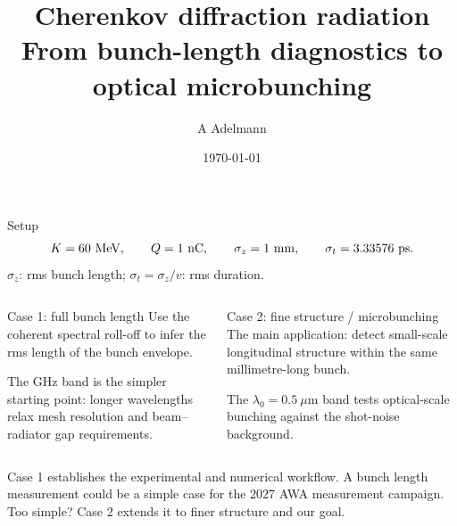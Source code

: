 \documentclass[10pt,aspectratio=169]{beamer}
\title{Cherenkov diffraction radiation\\[0.2em]\large From bunch-length diagnostics to optical microbunching}
\author{A Adelmann}
\date{\today}
\begin{document}
\begin{frame}
  \titlepage
  \vfill
\end{frame}

\begin{frame}{Setup}
\[
 K=60\ \mathrm{MeV},\qquad Q=1\ \mathrm{nC},\qquad
 \sigma_z=1\ \mathrm{mm},\qquad \sigma_t=\SigmaTimePs\ \mathrm{ps}.
\]
\(\sigma_z\): rms bunch length; \(\sigma_t=\sigma_z/v\): rms duration.
\normalsize
\begin{columns}[T,onlytextwidth]
\begin{block}{Case 1: full bunch length}
Use the coherent spectral roll-off to infer the rms length of the bunch envelope.

\medskip
The GHz band is the simpler starting point: longer wavelengths relax mesh resolution and beam--radiator gap requirements.
\end{block}
\begin{block}{Case 2: fine structure / microbunching}
The main application: detect small-scale longitudinal structure within the same millimetre-long bunch.

\medskip
The \(\lambda_0=0.5\ \mu\mathrm{m}\) band tests optical-scale bunching against the shot-noise background.
\end{block}
\end{columns}
\vfill

\small Case 1 establishes the experimental and numerical workflow. A bunch length measurement could be 
a simple case for the 2027 AWA measurement campaign. Too simple?  Case 2 extends it to finer structure and
our goal.
\end{frame}
\end{document}
